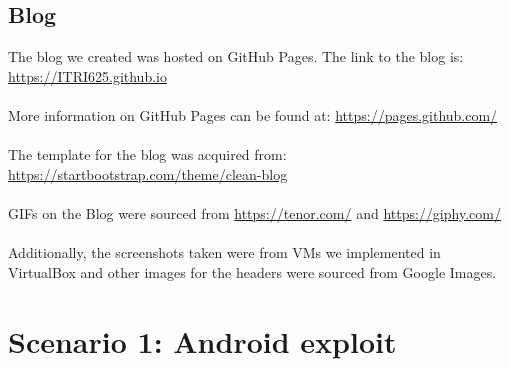 \documentclass[a4paper, 12pt, titlepage]{report}
\begin{document}
\section{Blog}
The blog we created was hosted on GitHub Pages. The link to the blog is:\\
\url{https://ITRI625.github.io}\\\\
More information on GitHub Pages can be found at: \url{https://pages.github.com/}\\\\
The template for the blog was acquired from:\\
\url{https://startbootstrap.com/theme/clean-blog}\\\\
GIFs on the Blog were sourced from \url{https://tenor.com/} and \url{https://giphy.com/}\\\\
Additionally, the screenshots taken were from VMs we implemented in VirtualBox and other images for the headers were sourced from Google Images.
\chapter{Scenario 1: Android exploit}
\label{sec:sec1}
\end{document}
